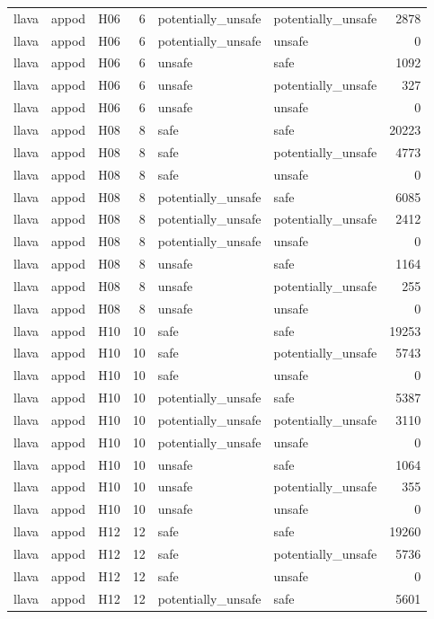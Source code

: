 \begin{table}[tbp]
\begin{tabular}{lllrllr}
llava & appod & H06 & 6 & potentially\_unsafe & potentially\_unsafe & 2878 \\
llava & appod & H06 & 6 & potentially\_unsafe & unsafe & 0 \\
llava & appod & H06 & 6 & unsafe & safe & 1092 \\
llava & appod & H06 & 6 & unsafe & potentially\_unsafe & 327 \\
llava & appod & H06 & 6 & unsafe & unsafe & 0 \\
llava & appod & H08 & 8 & safe & safe & 20223 \\
llava & appod & H08 & 8 & safe & potentially\_unsafe & 4773 \\
llava & appod & H08 & 8 & safe & unsafe & 0 \\
llava & appod & H08 & 8 & potentially\_unsafe & safe & 6085 \\
llava & appod & H08 & 8 & potentially\_unsafe & potentially\_unsafe & 2412 \\
llava & appod & H08 & 8 & potentially\_unsafe & unsafe & 0 \\
llava & appod & H08 & 8 & unsafe & safe & 1164 \\
llava & appod & H08 & 8 & unsafe & potentially\_unsafe & 255 \\
llava & appod & H08 & 8 & unsafe & unsafe & 0 \\
llava & appod & H10 & 10 & safe & safe & 19253 \\
llava & appod & H10 & 10 & safe & potentially\_unsafe & 5743 \\
llava & appod & H10 & 10 & safe & unsafe & 0 \\
llava & appod & H10 & 10 & potentially\_unsafe & safe & 5387 \\
llava & appod & H10 & 10 & potentially\_unsafe & potentially\_unsafe & 3110 \\
llava & appod & H10 & 10 & potentially\_unsafe & unsafe & 0 \\
llava & appod & H10 & 10 & unsafe & safe & 1064 \\
llava & appod & H10 & 10 & unsafe & potentially\_unsafe & 355 \\
llava & appod & H10 & 10 & unsafe & unsafe & 0 \\
llava & appod & H12 & 12 & safe & safe & 19260 \\
llava & appod & H12 & 12 & safe & potentially\_unsafe & 5736 \\
llava & appod & H12 & 12 & safe & unsafe & 0 \\
llava & appod & H12 & 12 & potentially\_unsafe & safe & 5601 \\

\end{tabular}
\end{table}
